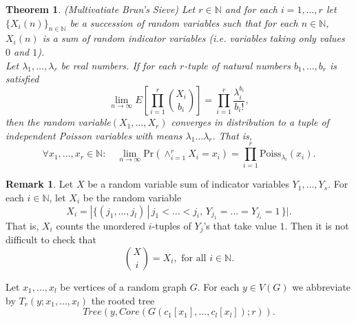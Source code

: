 \documentclass[11pt,notitlepage,a4paper]{article}
\newtheorem{theorem}{Theorem}[section]
\theoremstyle{definition}
\newtheorem{remark}{Remark}[section]
\newcommand{\N}{\mathbb{N}}
\newcommand{\Ln}{\lim\limits_{n\to \infty}}
\begin{document}
\begin{theorem}{(Multivatiate Brun's Sieve)}
	Let $r\in \N$ and for each $i=1,\dots, r$  let
	$\{X_i(n)\}_{n\in \N}$ be a succession of random variables 
	such that for each $n\in \N$, $X_i(n)$ 
	is a sum of random indicator variables (i.e. variables 
	taking only values $0$ and $1$).\\Let $\lambda_1, \dots ,
	\lambda_r$ be real numbers. If for each 
	$r$-tuple of natural numbers $b_1,\dots, b_r$
	is satisfied
	\[ \Ln E\left[\prod_{i=1}^r \binom{X_i}{b_i} \right] = 
	\prod_{i=1}^r \frac{\lambda_i^{b_i}}{b_i!}, \]
	then the random variable$(X_1,\dots ,X_r)$ converges in distribution
	to a tuple of independent Poisson variables with means $\lambda_1
	\dots \lambda_r$. That is,	
	\[ \forall x_1,\dots, x_r\in \N: \quad \Ln \mathrm{Pr}(\wedge_{i=1}^r
	 X_i=x_i)= \prod_{i=1}^r \mathrm{Poiss}_{\lambda_i}(x_i).\]

\end{theorem}

\begin{remark}
	Let $X$ be a random variable sum of indicator variables
	$Y_1, \dots, Y_s$. For each $i\in \N$, let 
	$X_i$ be the random variable
	\[X_i= |\{ (j_1,\dots, j_l)\, | \, j_1<\dots<j_i, \, Y_{j_1}=
	\dots = Y_{j_i}=1 \, \}|.\]
	That is, $X_i$ counts the unordered $i$-tuples of $Y_j$'s that 
	take value $1$. Then it is not difficult to check that
	\[ \binom{X}{i}= X_i, \text{ for all } i\in \N. \] 
\end{remark}

Let $x_1, \dots, x_l$ be vertices of a random graph $G$.
For each $y\in V(G)$ we abbreviate by $T_r(y; x_1,\dots, x_l)$
the rooted tree 
\[Tree(y, Core(G(c_1[x_1],\dots, c_l[x_l]);r)).\]
\end{document}
